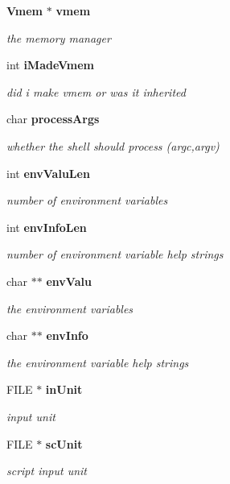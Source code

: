 \begin{DoxyCompactItemize}
\item 
{\bf Vmem} $\ast$ {\bf vmem}
\begin{DoxyCompactList}\small\item\em the memory manager \end{DoxyCompactList}\item 
int {\bf i\-Made\-Vmem}
\begin{DoxyCompactList}\small\item\em did i make vmem or was it inherited \end{DoxyCompactList}\item 
char {\bf process\-Args}
\begin{DoxyCompactList}\small\item\em whether the shell should process (argc,argv) \end{DoxyCompactList}\item 
int {\bf env\-Valu\-Len}
\begin{DoxyCompactList}\small\item\em number of environment variables \end{DoxyCompactList}\item 
int {\bf env\-Info\-Len}
\begin{DoxyCompactList}\small\item\em number of environment variable help strings \end{DoxyCompactList}\item 
char $\ast$$\ast$ {\bf env\-Valu}
\begin{DoxyCompactList}\small\item\em the environment variables \end{DoxyCompactList}\item 
char $\ast$$\ast$ {\bf env\-Info}
\begin{DoxyCompactList}\small\item\em the environment variable help strings \end{DoxyCompactList}\item 
F\-I\-L\-E $\ast$ {\bf in\-Unit}
\begin{DoxyCompactList}\small\item\em input unit \end{DoxyCompactList}\item 
F\-I\-L\-E $\ast$ {\bf sc\-Unit}
\begin{DoxyCompactList}\small\item\em script input unit \end{DoxyCompactList}\item 

\end{DoxyCompactItemize}
